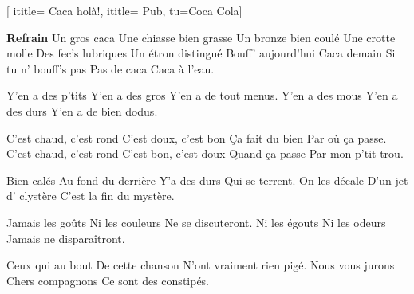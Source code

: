  [
ititle= {Caca holà!},
ititle= {Pub},
tu={Coca Cola}]


\beginchorus
\textbf {Refrain}
Un gros caca
Une chiasse bien grasse
Un bronze bien coulé
Une crotte molle
Des fec's lubriques
Un étron distingué
Bouff' aujourd'hui
Caca demain
Si tu n' bouff's pas
Pas de caca
Caca à l'eau.
\endchorus

\beginverse
Y'en a des p'tits
Y'en a des gros
Y'en a de tout menus.
Y'en a des mous
Y'en a des durs
Y'en a de bien dodus.
\endverse

\beginverse
C'est chaud, c'est rond
C'est doux, c'est bon
Ça fait du bien
Par où ça passe.
C'est chaud, c'est rond
C'est bon, c'est doux
Quand ça passe
Par mon p'tit trou.
\endverse

\beginverse
Bien calés
Au fond du derrière
Y'a des durs
Qui se terrent.
On les décale
D'un jet d' clystère
C'est la fin du mystère.
\endverse

\beginverse
Jamais les goûts
Ni les couleurs
Ne se discuteront.
Ni les égouts
Ni les odeurs
Jamais ne disparaîtront.
\endverse

\beginverse
Ceux qui au bout
De cette chanson
N'ont vraiment rien pigé.
Nous vous jurons
Chers compagnons
Ce sont des constipés.
\endverse

\endsong